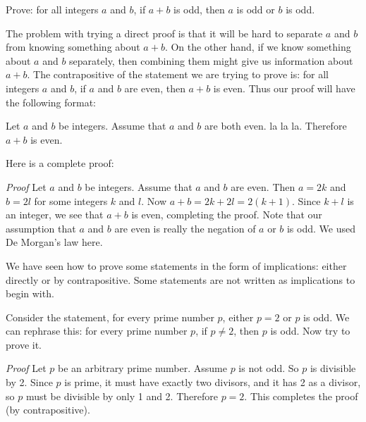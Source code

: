 \documentclass[11pt,]{book}
\makeatletter
\theoremstyle{ptxplainnotitle}
\theoremstyle{ptxplaintitle}
\renewcommand*{\proofname}{Proof}
\renewenvironment{proof}[1][\proofname]{\par
  \pushQED{\qed}%
  \normalfont \topsep6\p@\@plus6\p@\relax
  \trivlist
  \item\relax
    {\itshape
    #1\@addpunct{.}}\hspace\labelsep\ignorespaces
}{%
  \popQED\endtrivlist\@endpefalse
}
\theoremstyle{ptxdefinitionnotitle}
\theoremstyle{ptxdefinitiontitle}
\theoremstyle{ptxdefinitionnotitle}
\theoremstyle{ptxdefinitiontitle}
\theoremstyle{ptxdefinitionnotitle}
\theoremstyle{ptxdefinitiontitle}
\theoremstyle{ptxdefinitiontitlenonumber}
\theoremstyle{ptxdefinitiontitlenonumber}
\numberwithin{equation}{chapter}
\makeatother
\begin{document}
\begin{example}\label{example-66}
\hypertarget{p-2324}{}%
Prove: for all integers \(a\) and \(b\), if \(a + b\) is odd, then \(a\) is odd or \(b\) is odd.%
\par\smallskip%
\noindent\textbf{}\hypertarget{solution-253}{}\hypertarget{p-2325}{}%
The problem with trying a direct proof is that it will be hard to separate \(a\) and \(b\) from knowing something about \(a+b\). On the other hand, if we know something about \(a\) and \(b\) separately, then combining them might give us information about \(a+b\). The contrapositive of the statement we are trying to prove is: for all integers \(a\) and \(b\), if \(a\) and \(b\) are even, then \(a+b\) is even. Thus our proof will have the following format:%
\par
\hypertarget{p-2326}{}%
Let \(a\) and \(b\) be integers. Assume that \(a\) and \(b\) are both even. la la la. Therefore \(a+b\) is even.%
\par
\hypertarget{p-2327}{}%
Here is a complete proof:%
\begin{proof}\hypertarget{proof-25}{}
\hypertarget{p-2328}{}%
Let \(a\) and \(b\) be integers. Assume that \(a\) and \(b\) are even. Then \(a = 2k\) and \(b = 2l\) for some integers \(k\) and \(l\). Now \(a + b = 2k + 2l = 2(k+1)\). Since \(k + l\) is an integer, we see that \(a + b\) is even, completing the proof.%
\end{proof}
\hypertarget{p-2329}{}%
Note that our assumption that \(a\) and \(b\) are even is really the negation of \(a\) or \(b\) is odd. We used De Morgan's law here.%
\end{example}
\hypertarget{p-2330}{}%
We have seen how to prove some statements in the form of implications: either directly or by contrapositive. Some statements are not written as implications to begin with.%
\begin{example}\label{example-67}
\hypertarget{p-2331}{}%
Consider the statement, for every prime number \(p\), either \(p = 2\) or \(p\) is odd. We can rephrase this: for every prime number \(p\), if \(p \ne 2\), then \(p\) is odd. Now try to prove it.%
\par\smallskip%
\noindent\textbf{}\hypertarget{solution-254}{}\begin{proof}\hypertarget{proof-26}{}
\hypertarget{p-2332}{}%
Let \(p\) be an arbitrary prime number. Assume \(p\) is not odd. So \(p\) is divisible by 2. Since \(p\) is prime, it must have exactly two divisors, and it has 2 as a divisor, so \(p\) must be divisible by only 1 and 2. Therefore \(p = 2\). This completes the proof (by contrapositive).%
\end{proof}
\end{example}
\typeout{************************************************}
\typeout{************************************************}
\end{document}
